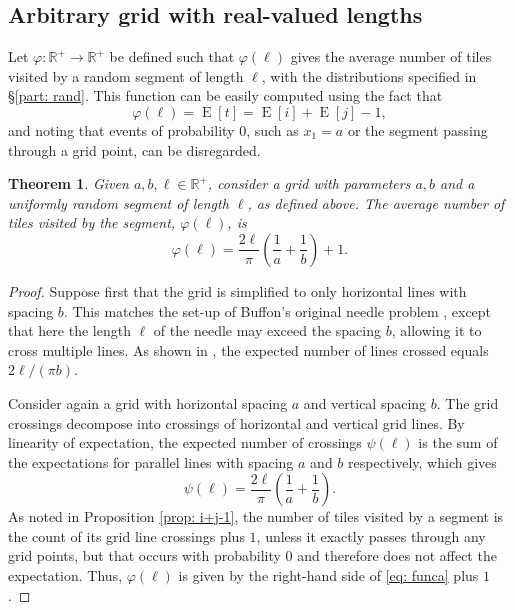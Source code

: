 \documentclass[12pt, a4paper]{article}
\DeclareMathOperator{\E}{E}
\newcommand{\funta}{\varphi} %
\newcommand{\funca}{\psi} %
\newcommand{\len}{\ell} %
\newcommand{\tiles}{t} %
\newtheorem{theorem}{Theorem}%
\begin{document}
\subsection{Arbitrary grid with real-valued lengths}
\label{part: probmax: arbitrary grid, real lengths}

Let $\funta: \mathbb R^+ \to \mathbb R^+$ be defined such that $\funta(\len)$ gives the average number of tiles visited by a random segment of length $\len$, with the distributions specified in \S\ref{part: rand}. This function can be easily computed using the fact that
\begin{equation}
\label{eq: funta E[i] E[j]}
\funta(\len) = \E[\tiles] = \E[i]+\E[j]-1,
\end{equation}
and noting that events of probability $0$, such as $x_1=a$ or the segment passing through a grid point, can be disregarded.

\begin{theorem}
\label{theo: funta, form}
Given $a, b, \len \in \mathbb R^+$, consider a grid with parameters $a, b$ and a uniformly random segment of length $\len$, as defined above. The average number of tiles visited by the segment, $\funta(\len)$, is 
\begin{equation}
\label{eq: funta, form}
\funta(\len) = \frac{2\len}{\pi}\left(\frac 1 a + \frac 1 b\right) + 1.
\end{equation}
\end{theorem}

\begin{proof}
Suppose first that the grid is simplified to only horizontal lines with spacing $b$. This matches the set-up of Buffon's original needle problem \cite{Mathai99}, except that here the length $\len$ of the needle may exceed the spacing $b$, allowing it to cross multiple lines. As shown in \cite{Ramaley69}, the expected number of lines crossed equals $2\len/(\pi b)$.

Consider again a grid with horizontal spacing $a$ and vertical spacing $b$. The grid crossings decompose into crossings of horizontal and vertical grid lines. By linearity of expectation, the expected number of crossings $\funca(\len)$ is the sum of the expectations for parallel lines with spacing $a$ and $b$ respectively, which gives
\begin{equation}
\label{eq: funca}
\funca(\len) = \frac{2\len}{\pi}\left(\frac 1 a + \frac 1 b\right).
\end{equation}
As noted in Proposition \ref{prop: i+j-1}, the number of tiles visited by a segment is the count of its grid line crossings plus $1$, unless it exactly passes through any grid points, but that occurs with probability $0$ and therefore does not affect the expectation. Thus, $\funta(\len)$ is given by the right-hand side of \eqref{eq: funca} plus $1$.
\end{proof}
\end{document}
